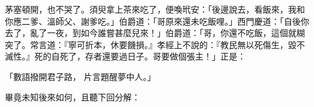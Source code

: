 \begin{showcontents}{}
茅塞頓開，也不哭了。須臾拿上茶來吃了，便喚玳安：「後邊說去，看飯來，我和你應二爹、溫師父、謝爹吃。」伯爵道：「哥原來還未吃飯哩。」西門慶道：「自後你去了，亂了一夜，到如今誰嘗甚麼兒來！」伯爵道：「哥，你還不吃飯，這個就糊突了。常言道：『寧可折本，休要饑損。』孝經上不說的：『教民無以死傷生，毀不滅性。』死的自死了，存者還要過日子。哥要做個張主！」正是：

「數語撥開君子路，  片言題醒夢中人。」

畢竟未知後來如何，且聽下回分解：





\end{showcontents}


